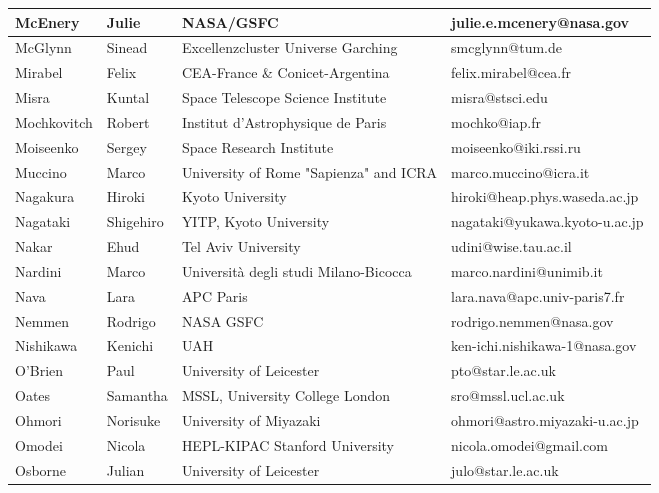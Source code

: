 \begin{center}
\begin{longtable}{|p{1.6cm} |p{1.6cm} |p{2cm} |p{3cm} |}
\tiny McEnery &\tiny Julie & \tiny NASA/GSFC & \tiny julie.e.mcenery@nasa.gov \\ \hline
\tiny McGlynn &\tiny Sinead & \tiny Excellenzcluster Universe Garching & \tiny smcglynn@tum.de \\ \hline
\tiny Mirabel &\tiny Felix & \tiny CEA-France \& Conicet-Argentina & \tiny felix.mirabel@cea.fr \\ \hline
\tiny Misra &\tiny Kuntal & \tiny Space Telescope Science Institute & \tiny misra@stsci.edu \\ \hline
\tiny Mochkovitch &\tiny Robert & \tiny Institut d'Astrophysique de Paris & \tiny mochko@iap.fr \\ \hline
\tiny Moiseenko &\tiny Sergey & \tiny Space Research Institute & \tiny moiseenko@iki.rssi.ru \\ \hline
\tiny Muccino &\tiny Marco & \tiny University of Rome "Sapienza" and ICRA & \tiny marco.muccino@icra.it \\ \hline
\tiny Nagakura &\tiny Hiroki & \tiny Kyoto University & \tiny hiroki@heap.phys.waseda.ac.jp \\ \hline
\tiny Nagataki &\tiny Shigehiro & \tiny YITP, Kyoto University & \tiny nagataki@yukawa.kyoto-u.ac.jp \\ \hline
\tiny Nakar &\tiny Ehud & \tiny Tel Aviv University & \tiny udini@wise.tau.ac.il \\ \hline
\tiny Nardini &\tiny Marco & \tiny Universit\`a degli studi Milano-Bicocca & \tiny marco.nardini@unimib.it \\ \hline
\tiny Nava &\tiny Lara & \tiny APC Paris & \tiny lara.nava@apc.univ-paris7.fr \\ \hline
\tiny Nemmen &\tiny Rodrigo & \tiny NASA GSFC & \tiny rodrigo.nemmen@nasa.gov \\ \hline
\tiny Nishikawa &\tiny Kenichi & \tiny UAH & \tiny ken-ichi.nishikawa-1@nasa.gov \\ \hline
\tiny O'Brien &\tiny Paul & \tiny University of Leicester & \tiny pto@star.le.ac.uk \\ \hline
\tiny Oates &\tiny Samantha & \tiny MSSL, University College London  & \tiny sro@mssl.ucl.ac.uk \\ \hline
\tiny Ohmori &\tiny Norisuke & \tiny University of Miyazaki & \tiny ohmori@astro.miyazaki-u.ac.jp \\ \hline
\tiny Omodei &\tiny Nicola & \tiny HEPL-KIPAC Stanford University & \tiny nicola.omodei@gmail.com \\ \hline
\tiny Osborne &\tiny Julian & \tiny University of Leicester & \tiny julo@star.le.ac.uk \\ \hline

\end{longtable}
\end{center}
